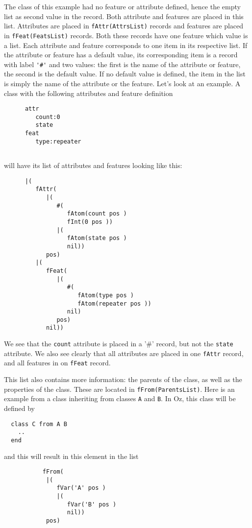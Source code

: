\documentclass[a4paper]{memoir}
\begin{document}
The class of this example had no feature or attribute defined, hence the empty
list as second value in the record.
Both attribute and features are placed in this list. Attributes are placed in
\lstinline!fAttr(AttrsList)! records and features are placed in
\lstinline!fFeat(FeatsList)! records. Both these records have one feature which
value is a list. Each attribute and feature corresponds to one item in its
respective list. If the attribute or feature has a default value, its
corresponding item is a record with label \lstinline!'#'! and two values: the
first is the name of the attribute or feature, the second is the default value.
If no default value is defined, the item in the list is simply the name of the
attribute or the feature.
Let's look at an example. A class with the following attributes and feature
definition
\begin{lstlisting}
      attr
         count:0
         state
      feat
         type:repeater
  
\end{lstlisting}
will have its list of attributes and features looking like this:
\begin{lstlisting}
      |(
         fAttr(
            |(
               #(
                  fAtom(count pos )
                  fInt(0 pos ))
               |(
                  fAtom(state pos )
                  nil))
            pos)
         |(
            fFeat(
               |(
                  #(
                     fAtom(type pos )
                     fAtom(repeater pos ))
                  nil)
               pos)
            nil))
\end{lstlisting}
We see that the \lstinline!count! attribute is placed in a '\#' record, but not
the \lstinline!state! attribute.
We also see clearly that all attributes are placed in one \lstinline!fAttr!
record, and all features in on \lstinline!fFeat! record.

This list also contains more information: the parents of the class, as well as
the properties of the class. These are located in \lstinline!fFrom(ParentsList)!. 
Here is an example from a class inheriting from classes \lstinline!A! and
\lstinline!B!. In Oz, this class will be defined by
\begin{lstlisting}
  class C from A B
    ..
  end
\end{lstlisting}
and this will result in this element in the list
\begin{lstlisting}
           fFrom(
            |(
               fVar('A' pos )
               |(
                  fVar('B' pos )
                  nil))
            pos)
\end{lstlisting}
\end{document}
